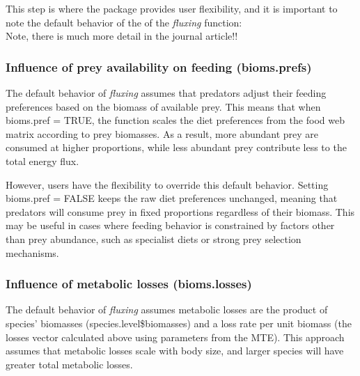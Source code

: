 \documentclass[
]{article}
\newenvironment{Shaded}{\begin{snugshade}}{\end{snugshade}}
\newcommand{\FunctionTok}[1]{\textcolor[rgb]{0.13,0.29,0.53}{\textbf{#1}}}
\newcommand{\NormalTok}[1]{#1}
\newcommand{\OtherTok}[1]{\textcolor[rgb]{0.56,0.35,0.01}{#1}}
\newcommand{\SpecialCharTok}[1]{\textcolor[rgb]{0.81,0.36,0.00}{\textbf{#1}}}
\begin{document}
\begin{Shaded}
\end{Shaded}

This step is where the package provides user flexibility, and it is
important to note the default behavior of the of the \emph{fluxing}
function:\\
Note, there is much more detail in the journal article!!

\subsubsection{Influence of prey availability on feeding
(bioms.prefs)}\label{influence-of-prey-availability-on-feeding-bioms.prefs}

The default behavior of \emph{fluxing} assumes that predators adjust
their feeding preferences based on the biomass of available prey. This
means that when bioms.pref = TRUE, the function scales the diet
preferences from the food web matrix according to prey biomasses. As a
result, more abundant prey are consumed at higher proportions, while
less abundant prey contribute less to the total energy flux.

However, users have the flexibility to override this default behavior.
Setting bioms.pref = FALSE keeps the raw diet preferences unchanged,
meaning that predators will consume prey in fixed proportions regardless
of their biomass. This may be useful in cases where feeding behavior is
constrained by factors other than prey abundance, such as specialist
diets or strong prey selection mechanisms.

\subsubsection{Influence of metabolic losses
(bioms.losses)}\label{influence-of-metabolic-losses-bioms.losses}

The default behavior of \emph{fluxing} assumes metabolic losses are the
product of species' biomasses (species.level\$biomasses) and a loss rate
per unit biomass (the losses vector calculated above using parameters
from the MTE). This approach assumes that metabolic losses scale with
body size, and larger species will have greater total metabolic losses.
\end{document}
